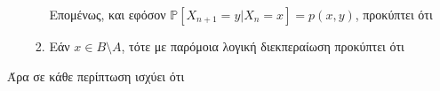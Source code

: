 \documentclass[a4paper,oneside, 11pt]{article}
\begin{document}
\begin{itemize}
\begin{enumerate}
\begin{enumerate}
			Επομένως, και εφόσον $\mathbb{P}[X_{n+1} = y | X_{n} = x] = p(x,y)$, προκύπτει ότι 
			\item Εάν $x \in B \setminus A$, τότε με παρόμοια λογική διεκπεραίωση προκύπτει ότι  
			
		\end{enumerate}
		
		
		
		
		
	\end{enumerate}
	Άρα σε κάθε περίπτωση ισχύει ότι 
	
	
\end{itemize}
\endgroup
\end{document}
